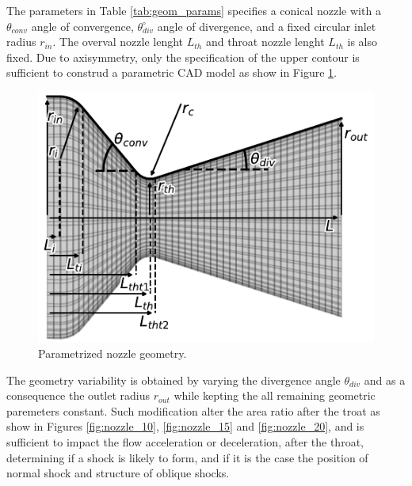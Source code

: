 The parameters in Table \ref{tab:geom_params} specifies a conical nozzle with a $\theta_{conv}$ angle of convergence,  $\theta_{div}^\circ$ angle of divergence, and a fixed circular inlet radius $r_{in}$. The overval nozzle lenght $L_{th}$ and throat nozzle lenght $L_{th}$ is also fixed. Due to axisymmetry, only the specification of the upper contour is sufficient to construd a parametric CAD model as show in Figure \ref{fig:geom_params}.

\begin{figure}[h]
    \centering
        \includegraphics[width=0.50\linewidth]{Figuras/geometry_figures/nozzle_15_xy.pdf}
        \caption{Parametrized nozzle geometry.}
        \label{fig:geom_params}
\end{figure}

The geometry variability is obtained by varying the divergence angle $\theta_{div}$ and as a consequence the outlet radius $r_{out}$ while kepting the all remaining geometric paremeters constant. Such modification alter the area ratio after the troat as show in Figures \ref{fig:nozzle_10}, \ref{fig:nozzle_15} and \ref{fig:nozzle_20}, and is sufficient to impact the flow acceleration or deceleration, after the throat, determining if a shock is likely to form, and if it is the case the position of normal shock and structure of oblique shocks.

